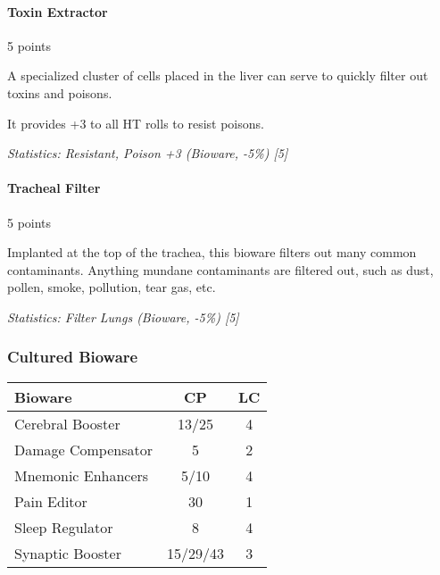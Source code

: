 \begin{multicols*}{3}
	\paragraph{Toxin Extractor}
	\begin{flushright}
		5 points
	\end{flushright}
	
	A specialized cluster of cells placed in the liver can serve to quickly filter out toxins and poisons.
	
	It provides +3 to all HT rolls to resist poisons.
	
	\textit{\textcolor{OliveGreen}{Statistics: Resistant, Poison +3 (Bioware, -5\%) [5]}}
	
	\paragraph{Tracheal Filter}
	\begin{flushright}
		5 points
	\end{flushright}
	
	Implanted at the top of the trachea, this bioware filters out many common contaminants. Anything mundane contaminants are filtered out, such as dust, pollen, smoke, pollution, tear gas, etc.
	
	\textit{\textcolor{OliveGreen}{Statistics: Filter Lungs (Bioware, -5\%) [5]}}
	
	\subsubsection{Cultured Bioware}
	
	\begin{center}
		\begin{adjustwidth}{-4mm}{}
		\begin{tabularx}{0.35\textwidth}{|X|c|c|}
			\hline
			Bioware & CP & LC\\
			\hline
			\hline
			Cerebral Booster & 13/25 & 4 \\
			Damage Compensator & 5 & 2 \\
			Mnemonic Enhancers & 5/10 & 4 \\
			Pain Editor & 30 & 1 \\
			Sleep Regulator & 8 & 4 \\
			Synaptic Booster & 15/29/43 & 3 \\
			\hline
		\end{tabularx}
		\end{adjustwidth}
	\end{center}
	

\end{multicols*}
